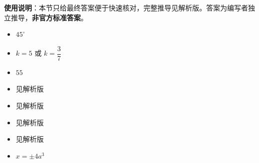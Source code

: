 
\begin{gknotice}
\textbf{使用说明}：本节只给最终答案便于快速核对，完整推导见解析版。答案为编写者独立推导，\textbf{非官方标准答案}。
\end{gknotice}

\begin{itemize}[leftmargin=2.6em]
  \item[\textbf{1.}] $45^\circ$
  \item[\textbf{2.}] $k=5$ 或 $k=\dfrac37$
  \item[\textbf{3.}] $55$
  \item[\textbf{4.}] 见解析版
  \item[\textbf{5.}] 见解析版
  \item[\textbf{6.}] 见解析版
  \item[\textbf{7.}] 见解析版
  \item[\textbf{8.}] $x=\pm4a^3$
\end{itemize}
